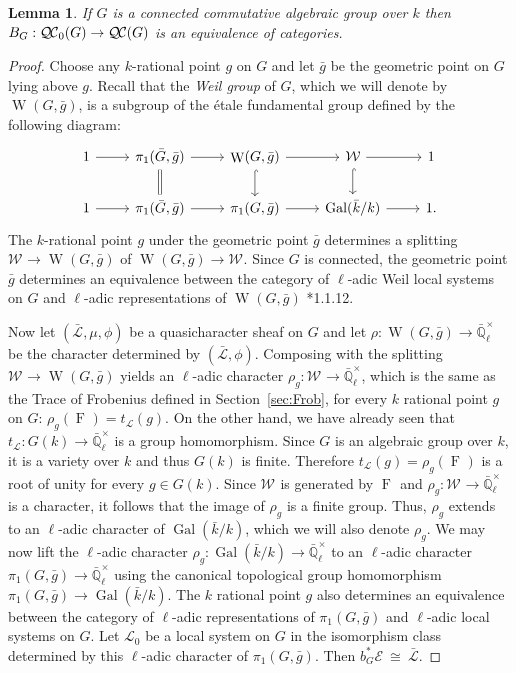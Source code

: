 \documentclass{amsart}
\theoremstyle{plain}
\newtheorem{lemma}[theorem]{Lemma}
\theoremstyle{definition}
\theoremstyle{remark}
\newcommand{\EE}{\mathbb{\bar Q}_\ell}
\newcommand{\bFq}{\bar{k}}
\newcommand{\Fq}{k}
\newcommand{\EEx}{\EE^\times}
\newcommand{\Weil}[1]{\mathcal{W}_{#1}}
\DeclareMathOperator{\Gal}{Gal}
\DeclareMathOperator{\W}{W}
\newcommand{\Frob}[1]{\operatorname{F}_{#1}}
\newcommand{\iso}{{\ \cong\ }}
\newcommand{\trFrob}[1]{t_{#1}}
\newcommand{\qcs}[1]{{\mathcal{#1}}}
\newcommand{\gqcs}[1]{{\mathcal{\bar #1}}}
\newcommand{\QC}{{\mathcal{Q\hskip-0.8pt C}}}
\newcommand{\bQC}{{\QC_0}}
\newcommand{\bg}{\bar{g}}
\newcommand{\bG}{\bar{G}}
\begin{document}
\begin{lemma}\label{lem:bounded_connected}
If $G$ is a connected commutative algebraic group over $\Fq$ then $B_G : \bQC(G) \to \QC(G)$ is an equivalence of categories.
\end{lemma}

\begin{proof}
Choose any $\Fq$-rational point $g$ on $G$ and let $\bg$ be the geometric point on $G$ lying above $g$.
Recall that the \emph{Weil group} of $G$, which we will denote by $\W(G,\bg)$, is a subgroup of the \'etale
fundamental group defined by the following diagram:
\[
 \begin{tikzcd}
 1 \rar & \ar[equal]{d} \pi_1(\bG, \bg) \rar & \W(G,\bg) \rar \dar[hook] & \Weil{} \rar \dar[hook] & 1 \\
 1 \rar &  \pi_1(\bG, \bg) \rar & \pi_1(G,\bg) \rar & \Gal(\bFq/\Fq) \rar & 1.
 \end{tikzcd}
\]
The $\Fq$-rational point $g$ under the geometric point $\bg$ determines a splitting
$\Weil{}\to \W(G,\bg)$ of $\W(G,\bg)\to \Weil{}$.
%
  Since $G$ is connected, the geometric point $\bg$ determines
  an equivalence between the category of $\ell$-adic Weil local systems on $G$ and
  $\ell$-adic representations of $\W(G,\bg)$ \cite{deligne:80a}*{1.1.12}.
  
  Now let $(\gqcs{L},\mu,\phi)$ be a quasicharacter sheaf on $G$
  and let $\rho : \W(G, \bg) \to \EEx$ be the character determined by $(\gqcs{L},\phi)$.
  Composing with the splitting $\Weil{} \to \W(G,\bg)$ yields an $\ell$-adic character
  $\rho_g : \Weil{} \to \EEx$, which is the same as the Trace of Frobenius defined in Section~\ref{sec:Frob}, for every $\Fq$ rational point $g$ on $G$:
  $
  \rho_g(\Frob{}) =  \trFrob{\qcs{L}}(g).
  $
%
  On the other hand, we have already seen that $\trFrob{\qcs{L}} : G(\Fq) \to \EEx$
  is a group homomorphism. Since $G$ is an algebraic group over $\Fq$, it is a
  variety over $\Fq$ and thus $G(\Fq)$ is finite.
  Therefore $\trFrob{\qcs{L}}(g) = \rho_g(\Frob{})$ is a root of unity
  for every $g\in G(\Fq)$.  Since $\Weil{}$ is generated by
  $\Frob{}$ and $\rho_g : \Weil{} \to \EEx$ is
  a character, it follows that the image of $\rho_g$ is a finite group.
  Thus, $\rho_g$ extends to an $\ell$-adic character of $\Gal(\bFq/\Fq)$,
  which we will also denote $\rho_g$.
%
  We may now lift the $\ell$-adic character $\rho_g : \Gal(\bFq/\Fq) \to \EEx$
  to an $\ell$-adic character $\pi_1(G,\bg) \to \EEx$ using the canonical topological group homomorphism
  $\pi_1(G,\bg) \to \Gal(\bFq/\Fq)$. 
  The $\Fq$ rational point $g$ also
  determines an equivalence between the category of $\ell$-adic
  representations of $\pi_1(G,\bg)$ and $\ell$-adic local systems on $G$. Let
  $\qcs{L}_0$ be a local system on $G$ in the isomorphism class
  determined by this $\ell$-adic character of $\pi_1(G,\bg)$.
  Then $b_G^*\qcs{E} \iso \gqcs{L}$.
  

\end{proof}
\end{document}
